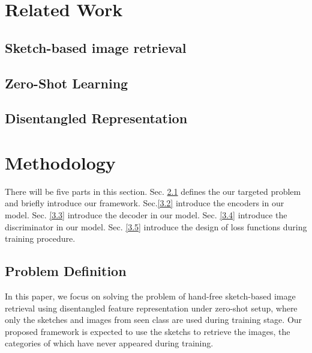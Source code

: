 \documentclass[10pt,twocolumn,letterpaper]{article}
\begin{document}

\section{Related Work}

\subsection{Sketch-based image retrieval}

\subsection{Zero-Shot Learning}

\subsection{Disentangled Representation}

\section{Methodology}
There will be five parts in this section. Sec. \ref{3.1} defines the our targeted problem and briefly introduce our framework. Sec.\ref{3.2} introduce the encoders in our model. Sec. \ref{3.3} introduce the decoder in our model. Sec. \ref{3.4} introduce the discriminator in our model. Sec. \ref{3.5} introduce the design of loss functions during training procedure.

\subsection{Problem Definition} \label{3.1}
In this paper, we focus on solving the problem of hand-free sketch-based image retrieval using disentangled feature representation under zero-shot setup, where only the sketches and images from seen class are used during training stage. Our proposed framework is expected to use the sketchs to retrieve the images, the categories of which have never appeared during training.
\end{document}
